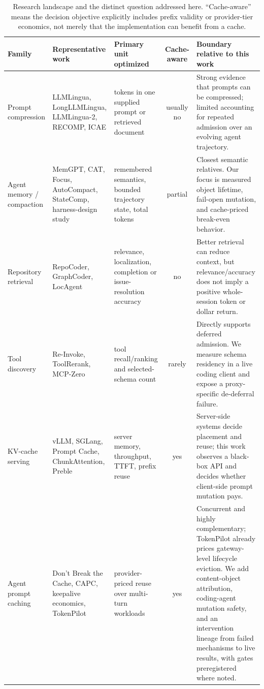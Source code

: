 \documentclass[10pt,twocolumn]{article}
\begin{document}
\begin{table}[t]
\centering
\caption{Research landscape and the distinct question addressed here. ``Cache-aware'' means the
decision objective explicitly includes prefix validity or provider-tier economics, not merely that
the implementation can benefit from a cache.}
\label{tab:landscape}
\small
\begin{tabularx}{\textwidth}{p{}p{}p{}cX}
\toprule
Family & Representative work & Primary unit optimized & Cache-aware & Boundary relative to this work \\
\midrule
Prompt compression & LLMLingua, LongLLMLingua, LLMLingua-2, RECOMP, ICAE
\cite{jiang2023llmlingua,jiang2024longllmlingua,pan2024llmlingua2,xu2024recomp,ge2024icae}
& tokens in one supplied prompt or retrieved document & usually no & Strong evidence that prompts can
be compressed; limited accounting for repeated admission over an evolving agent trajectory. \\
Agent memory / compaction & MemGPT, CAT, Focus, AutoCompact, StateComp, harness-design study
\cite{packer2023memgpt,liu2026cat,verma2026focus,zhang2026autocompact,wang2026statecomp,fan2026harness}
& remembered semantics, bounded trajectory state, total tokens & partial & Closest semantic
relatives.  Our focus is measured object lifetime, fail-open mutation, and cache-priced break-even
behavior. \\
Repository retrieval & RepoCoder, GraphCoder, LocAgent
\cite{zhang2023repocoder,liu2024graphcoder,chen2025locagent}
& relevance, localization, completion or issue-resolution accuracy & no & Better retrieval can reduce
context, but relevance/accuracy does not imply a positive whole-session token or dollar return. \\
Tool discovery & Re-Invoke, ToolRerank, MCP-Zero
\cite{chen2024reinvoke,zheng2024toolrerank,fei2025mcpzero}
& tool recall/ranking and selected-schema count & rarely & Directly supports deferred admission.  We
measure schema residency in a live coding client and expose a proxy-specific de-deferral failure. \\
KV-cache serving & vLLM, SGLang, Prompt Cache, ChunkAttention, Preble
\cite{kwon2023pagedattention,zheng2024sglang,gim2024promptcache,ye2024chunkattention,srivatsa2024preble}
& server memory, throughput, TTFT, prefix reuse & yes & Server-side systems decide placement and
reuse; this work observes a black-box API and decides whether client-side prompt mutation pays. \\
Agent prompt caching & Don't Break the Cache, CAPC, keepalive economics, TokenPilot
\cite{lumer2026cache,song2026capc,khailo2026keepalive,xu2026tokenpilot}
& provider-priced reuse over multi-turn workloads & yes & Concurrent and highly complementary;
TokenPilot already prices gateway-level lifecycle eviction.  We add content-object attribution,
coding-agent mutation safety, and an intervention lineage from failed mechanisms to live results,
with gates preregistered where noted. \\
\bottomrule
\end{tabularx}
\end{table}
\end{document}
